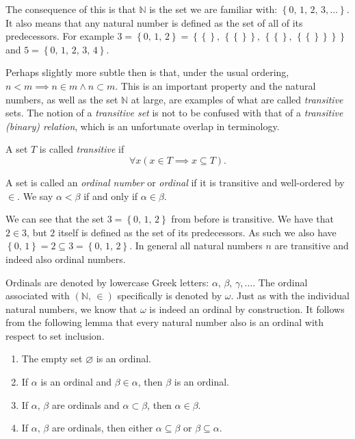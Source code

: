 \documentclass[../../main.tex]{subfiles}
\begin{document}
The consequence of this is that $\mathbb{N}$ is the set we are familiar with: $\left\{0,\, 1,\, 2,\, 3,\ldots\right\}$.
It also means that any natural number is defined as the set of all of its predecessors.
For example $3 = \left\{0,\, 1,\, 2\right\} = \left\{\left\{\right\},\, \left\{\left\{\right\}\right\},\, \left\{\left\{\right\},\, \left\{\left\{\right\}\right\}\right\}\right\}$ and $5 = \left\{0,\, 1,\, 2,\, 3,\, 4\right\}$.

Perhaps slightly more subtle then is that, under the usual ordering, $n < m \implies n \in m \wedge n \subset m$.
This is an important property and the natural numbers, as well as the set $\mathbb{N}$ at large, are examples of what are called \textit{transitive} sets.
The notion of a \textit{transitive set} is not to be confused with that of a \textit{transitive (binary) relation}, which is an unfortunate overlap in terminology.

\begin{definition}\cite[p.14]{Jec78}
    A set $T$ is called \textit{transitive} if $$\forall x \left(x \in T \implies x \subseteq T\right).$$
\end{definition}

\begin{definition}\cite[p.14]{Jec78}
    A set is called an \textit{ordinal number} or \textit{ordinal} if it is transitive and well-ordered by $\in$.
    We say $\alpha < \beta$ if and only if $\alpha \in \beta$.
\end{definition}

We can see that the set $3 = \left\{0,\, 1,\, 2\right\}$ from before is transitive.
We have that $2 \in 3$, but $2$ itself is defined as the set of its predecessors.
As such we also have $\left\{0,\, 1\right\} = 2 \subseteq 3 = \left\{0,\, 1,\, 2\right\}$.
In general all natural numbers $n$ are transitive and indeed also ordinal numbers.

Ordinals are denoted by lowercase Greek letters: $\alpha,\, \beta,\, \gamma,\ldots.$
The ordinal associated with $\left(\mathbb{N},\, \in\right)$ specifically is denoted by $\omega$.
Just as with the individual natural numbers, we know that $\omega$ is indeed an ordinal by construction.
It follows from the following lemma that every natural number also is an ordinal with respect to set inclusion.

\begin{lemma}\cite[Lemma 2.3]{Jec78}
    \begin{enumerate}
        \item The empty set $\varnothing$ is an ordinal.
        \item If $\alpha$ is an ordinal and $\beta \in \alpha$, then $\beta$ is an ordinal.
        \item If $\alpha,\, \beta$ are ordinals and $\alpha \subset \beta$, then $\alpha \in \beta$.
        \item If $\alpha,\, \beta$ are ordinals, then either  $\alpha \subseteq \beta$ or $\beta \subseteq \alpha$.
    \end{enumerate}
\end{lemma}
\end{document}
